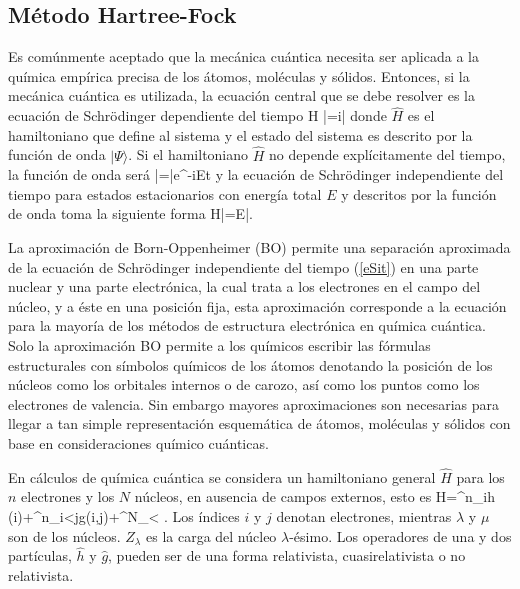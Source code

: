 \subsection{M\'etodo Hartree-Fock}
Es com\'unmente aceptado que la mec\'anica cu\'antica necesita ser
aplicada a la qu\'imica %
emp\'irica precisa de los \'atomos, mol\'eculas y s\'olidos. 
Entonces, si la mec\'anica cu\'antica es utilizada, la ecuaci\'on 
central que se debe resolver es la ecuaci\'on de Schr\"odinger
dependiente del tiempo
\be\label{eSdt}
\hat H |\Psi\rangle=i|\Psi\rangle
\ee
donde $\hat H$ es el hamiltoniano que define al sistema y el estado
del sistema es descrito por la funci\'on de onda $|\Psi\rangle$. 
Si el hamiltoniano $\hat H$ no depende expl\'icitamente del tiempo, 
la funci\'on de onda ser\'a
\be\label{ef}
|\Psi\rangle=|\psi\rangle\cdot e^{-iEt}
\ee
y la ecuaci\'on de Schr\"odinger independiente del tiempo para 
estados estacionarios con energ\'ia total $E$ y descritos por la 
funci\'on de onda toma la siguiente forma
\be\label{eSit}
\hat H|\psi\rangle=E|\psi\rangle.
\ee

La aproximaci\'on de Born-Oppenheimer (BO) permite una separaci\'on
aproximada  de la ecuaci\'on de Schr\"odinger independiente del 
tiempo (\ref{eSit}) en una parte nuclear y una parte electr\'onica, 
la cual trata a los electrones en el campo del n\'ucleo, y a \'este 
en una posici\'on fija, esta aproximaci\'on corresponde a la 
ecuaci\'on para la mayor\'ia de los m\'etodos de estructura 
electr\'onica en qu\'imica cu\'antica. Solo la aproximaci\'on BO 
permite a los qu\'imicos escribir las f\'ormulas estructurales con 
s\'imbolos qu\'imicos de los \'atomos denotando la posici\'on de los 
n\'ucleos como los orbitales internos o de carozo, as\'i  como los 
puntos como los electrones de valencia. Sin embargo mayores 
aproximaciones son necesarias para llegar a tan  simple 
representaci\'on esquem\'atica de \'atomos, mol\'eculas y s\'olidos 
con base en consideraciones qu\'imico cu\'anticas.

En c\'alculos de qu\'imica cu\'antica se considera un hamiltoniano
general $\hat H$ para los $n$ electrones y los $N$ n\'ucleos, en 
ausencia de campos externos, esto es
\be
\hat H=\sum^n_i\hat h (i)+\sum^n_{i<j}\hat g(i,j)+\sum^N_{\lambda<\mu}
.
\ee
Los \'indices $i$ y $j$ denotan electrones, mientras $\lambda$ y 
$\mu$ son de los n\'ucleos. $Z_{\lambda}$ es la carga del n\'ucleo 
$\lambda$-\'esimo. Los operadores de una y dos part\'iculas, $\hat h$ 
y $\hat g$, pueden ser de una forma relativista, cuasirelativista o 
no relativista.

